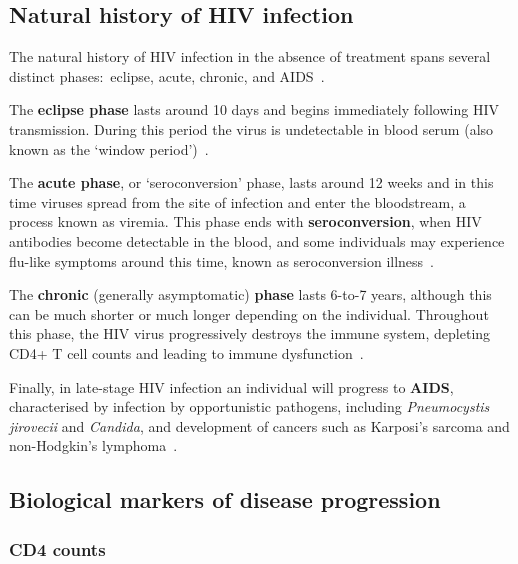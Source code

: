 \subsection{Natural history of HIV infection}

The natural history of HIV infection in the absence of treatment spans several distinct phases:\ eclipse, acute, chronic, and AIDS~\parencite{Maartens2014-xd}.

The \textbf{eclipse phase} lasts around 10 days and begins immediately following HIV transmission. During this period the virus is undetectable in blood serum (also known as the `window period')~\parencite{Cohen2010-ol}.

The \textbf{acute phase}, or `seroconversion' phase, lasts around 12 weeks and in this time viruses spread from the site of infection and enter the bloodstream, a process known as viremia. This phase ends with \textbf{seroconversion}, when HIV antibodies become detectable in the blood, and some individuals may experience flu-like symptoms around this time, known as seroconversion illness~\parencite{Cohen2010-ol, Muema2020-zr}.

The \textbf{chronic} (generally asymptomatic) \textbf{phase} lasts 6-to-7 years, although this can be much shorter or much longer depending on the individual. Throughout this phase, the HIV virus progressively destroys the immune system, depleting CD4+ T cell counts and leading to immune dysfunction~\parencite{Maartens2014-xd}.

Finally, in late-stage HIV infection an individual will progress to \textbf{AIDS}, characterised by infection by opportunistic pathogens, including \textit{Pneumocystis jirovecii} and \textit{Candida}, and development of cancers such as Karposi's sarcoma and non-Hodgkin's lymphoma~\parencite{Dowdle1983-yd}.

\subsection{Biological markers of disease progression}\label{sec:biomarkers}

\subsubsection{CD4 counts}

